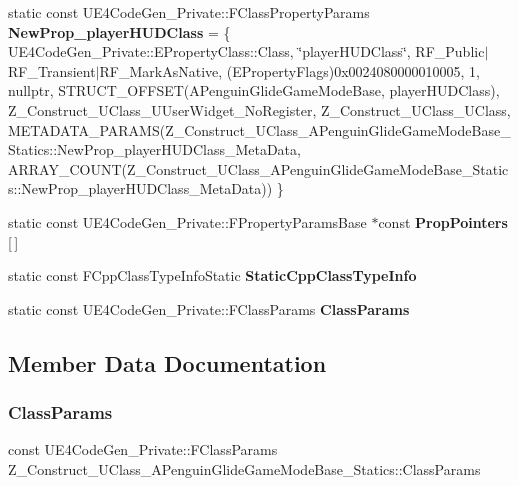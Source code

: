 \begin{DoxyCompactItemize}
\mbox{\label{struct_z___construct___u_class___a_penguin_glide_game_mode_base___statics_a08b32ba93e1bf6998a16e39e05363a1b}} 
static const U\+E4\+Code\+Gen\+\_\+\+Private\+::\+F\+Class\+Property\+Params {\bfseries New\+Prop\+\_\+player\+H\+U\+D\+Class} = \{ U\+E4\+Code\+Gen\+\_\+\+Private\+::\+E\+Property\+Class\+::\+Class, \char`\"{}player\+H\+U\+D\+Class\char`\"{}, R\+F\+\_\+\+Public$\vert$R\+F\+\_\+\+Transient$\vert$R\+F\+\_\+\+Mark\+As\+Native, (E\+Property\+Flags)0x0024080000010005, 1, nullptr, S\+T\+R\+U\+C\+T\+\_\+\+O\+F\+F\+S\+E\+T(\+A\+Penguin\+Glide\+Game\+Mode\+Base, player\+H\+U\+D\+Class), Z\+\_\+\+Construct\+\_\+\+U\+Class\+\_\+\+U\+User\+Widget\+\_\+\+No\+Register, Z\+\_\+\+Construct\+\_\+\+U\+Class\+\_\+\+U\+Class, M\+E\+T\+A\+D\+A\+T\+A\+\_\+\+P\+A\+R\+A\+M\+S(\+Z\+\_\+\+Construct\+\_\+\+U\+Class\+\_\+\+A\+Penguin\+Glide\+Game\+Mode\+Base\+\_\+\+Statics\+::\+New\+Prop\+\_\+player\+H\+U\+D\+Class\+\_\+\+Meta\+Data, A\+R\+R\+A\+Y\+\_\+\+C\+O\+U\+N\+T(\+Z\+\_\+\+Construct\+\_\+\+U\+Class\+\_\+\+A\+Penguin\+Glide\+Game\+Mode\+Base\+\_\+\+Statics\+::\+New\+Prop\+\_\+player\+H\+U\+D\+Class\+\_\+\+Meta\+Data)) \}
\item 
static const U\+E4\+Code\+Gen\+\_\+\+Private\+::\+F\+Property\+Params\+Base $\ast$const {\bfseries Prop\+Pointers} \mbox{[}$\,$\mbox{]}
\item 
static const F\+Cpp\+Class\+Type\+Info\+Static {\bfseries Static\+Cpp\+Class\+Type\+Info}
\item 
static const U\+E4\+Code\+Gen\+\_\+\+Private\+::\+F\+Class\+Params {\bfseries Class\+Params}
\end{DoxyCompactItemize}


\subsection{Member Data Documentation}
\mbox{\label{struct_z___construct___u_class___a_penguin_glide_game_mode_base___statics_a099461eea7091a273495ba2f49f1b8f5}} 
\subsubsection{\texorpdfstring{ClassParams}{ClassParams}}
{\footnotesize\ttfamily const U\+E4\+Code\+Gen\+\_\+\+Private\+::\+F\+Class\+Params Z\+\_\+\+Construct\+\_\+\+U\+Class\+\_\+\+A\+Penguin\+Glide\+Game\+Mode\+Base\+\_\+\+Statics\+::\+Class\+Params\hspace{0.3cm}{\ttfamily [static]}}

